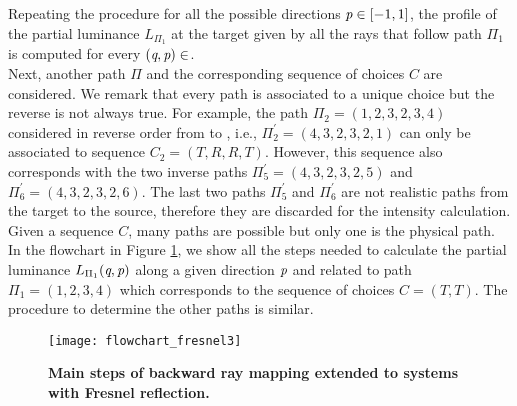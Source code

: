 Repeating the procedure for all the possible directions $\textit{p}\in[-1,1]$, the profile of the partial luminance $L_{\Pi_1}$ at the target given by all the rays that follow path $\Pi_1$ is computed for every $(\textit{q}, \textit{p})\in$. 
\\ \indent Next, another path $\Pi$ and the corresponding sequence of choices $C$ are considered. We remark that every path is associated to a unique choice but the reverse is not always true. For example, the path $\Pi_2 = (1,2,3,2,3,4)$ considered in reverse order from  to , i.e., $\Pi_2^{\prime} = (4,3,2,3,2,1)$ can only be associated to sequence $C_2 = (T,R,R,T)$. However, this sequence also corresponds with the two inverse paths $\Pi_5^{\prime}= (4,3,2,3,2,5)$ and $\Pi_6^{\prime}= (4,3,2,3,2,6)$. The last two paths $\Pi_5^{\prime}$ and $\Pi_6^{\prime}$ are not realistic paths from the target to the source, therefore they are discarded for the intensity calculation. Given a sequence $C$, many paths are possible but only one is the physical path. In the flowchart in Figure \ref{fig:flowchart_fresnel}, we show all the steps needed to calculate the partial luminance $L_{\Pi_1}(\textit{q}, \textit{p})$  along a given direction $\textit{p}$ and related to path $\Pi_1 = (1,2,3,4)$ which corresponds to the sequence of choices $C= (T,T)$. The procedure to determine the other paths is similar.
\begin{figure}[t]
  \begin{center}
  \texttt{[image: flowchart\_fresnel3]}
  \end{center}
  \caption{\textbf{Main steps of backward ray mapping extended to systems with Fresnel reflection.}}
\label{fig:flowchart_fresnel}
 \end{figure}
